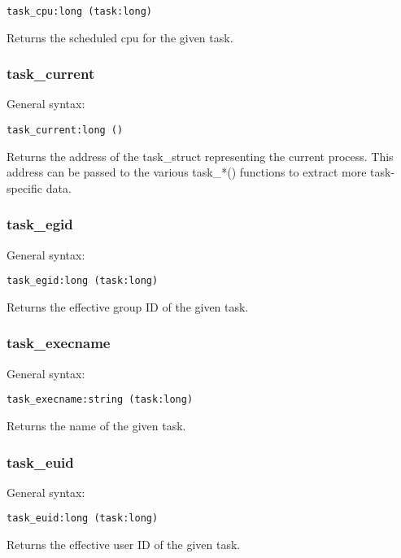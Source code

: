 \documentclass[twoside,english]{article}
\newenvironment{vindent}
{\begin{list}{}{\setlength{\listparindent}{6pt}}
\item[]}
{\end{list}}
\begin{document}
\begin{vindent}
\begin{verbatim}
task_cpu:long (task:long)
\end{verbatim}
\end{vindent}
Returns the scheduled cpu for the given task.


\subsubsection{task\_current}
General syntax:

\begin{vindent}
\begin{verbatim}
task_current:long ()
\end{verbatim}
\end{vindent}
Returns the address of the task\_struct representing
the current process. This address can be passed to the various task\_{*}()
functions to extract more task-specific data.


\subsubsection{task\_egid}
General syntax:

\begin{vindent}
\begin{verbatim}
task_egid:long (task:long)
\end{verbatim}
\end{vindent}
Returns the effective group ID of the given task.


\subsubsection{task\_execname}
General syntax:

\begin{vindent}
\begin{verbatim}
task_execname:string (task:long)
\end{verbatim}
\end{vindent}
Returns the name of the given task.


\subsubsection{task\_euid}
General syntax:

\begin{vindent}
\begin{verbatim}
task_euid:long (task:long)
\end{verbatim}
\end{vindent}
Returns the effective user ID of the given task.
\end{document}
